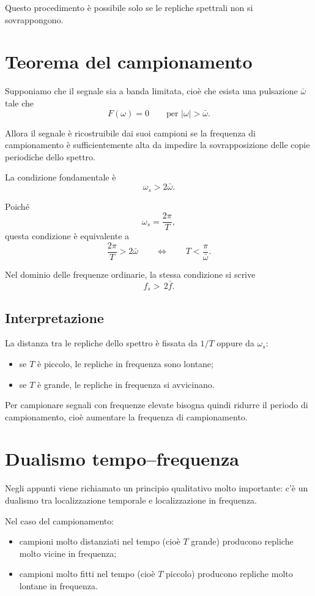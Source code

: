 Questo procedimento è possibile solo se le repliche spettrali non si sovrappongono.

\section{Teorema del campionamento}

Supponiamo che il segnale sia a banda limitata, cioè che esista una pulsazione \(\bar\omega\)
tale che
\[
F(\omega)=0
\qquad
\text{per } |\omega|>\bar\omega.
\]

Allora il segnale è ricostruibile dai suoi campioni se la frequenza di campionamento
è sufficientemente alta da impedire la sovrapposizione delle copie periodiche dello spettro.

La condizione fondamentale è
\[
\omega_s > 2\bar\omega.
\]

Poiché
\[
\omega_s=\frac{2\pi}{T},
\]
questa condizione è equivalente a
\[
\frac{2\pi}{T}>2\bar\omega
\qquad \Longleftrightarrow \qquad
T<\frac{\pi}{\bar\omega}.
\]

Nel dominio delle frequenze ordinarie, la stessa condizione si scrive
\[
f_s>\,2\bar f.
\]

\subsection{Interpretazione}

La distanza tra le repliche dello spettro è fissata da \(1/T\) oppure da \(\omega_s\):
\begin{itemize}
    \item se \(T\) è piccolo, le repliche in frequenza sono lontane;
    \item se \(T\) è grande, le repliche in frequenza si avvicinano.
\end{itemize}

Per campionare segnali con frequenze elevate bisogna quindi ridurre il periodo di campionamento,
cioè aumentare la frequenza di campionamento.

\section{Dualismo tempo--frequenza}

Negli appunti viene richiamato un principio qualitativo molto importante:
c'è un dualismo tra localizzazione temporale e localizzazione in frequenza.

Nel caso del campionamento:
\begin{itemize}
    \item campioni molto distanziati nel tempo (cioè \(T\) grande) producono repliche
    molto vicine in frequenza;
    \item campioni molto fitti nel tempo (cioè \(T\) piccolo) producono repliche
    molto lontane in frequenza.
\end{itemize}

